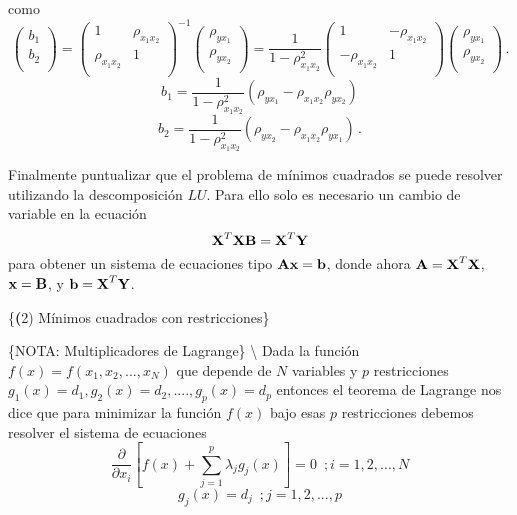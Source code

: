 \documentclass[
]{agujournal2019}
\begin{document}
como \[\left(\begin{array}{c}
  b_1 \\
  b_2 \\
        \end{array}\right)=\left(\begin{array}{cc}
  1 & \rho_{x_{1} x_{2}} \\
  \rho_{x_{1} x_{2}} & 1 \\
        \end{array}\right)^{-1}
     \left(\begin{array}{c}
  \rho_{y x_{1}} \\
  \rho_{y x_{2}} \\
        \end{array}\right)=\frac{1}{1-\rho^2_{x_{1} x_{2}}}
    \left(\begin{array}{cc}
  1 & -\rho_{x_{1} x_{2}} \\
  -\rho_{x_{1} x_{2}} & 1 \\
        \end{array}\right)\left(\begin{array}{c}
  \rho_{y x_{1}} \\
  \rho_{y x_{2}} \\
        \end{array}\right)\,.\]
\[b_1=\frac{1}{1-\rho^2_{x_{1} x_{2}}}({\rho_{y x_{1}} - \rho_{x_{1} x_{2}} \rho_{y x_{2}}})\]
\[b_2=\frac{1}{1-\rho^2_{x_{1} x_{2}}}({\rho_{y x_{2}} - \rho_{x_{1} x_{2}} \rho_{y x_{1}}})\,.\]

\noindent Finalmente puntualizar que el problema de mínimos cuadrados se
puede resolver utilizando la descomposición \(LU\). Para ello solo es
necesario un cambio de variable en la ecuación
\[{\textbf X}^T{\textbf X}{\textbf B}={\textbf X}^T{\textbf Y}\] para
obtener un sistema de ecuaciones tipo
\({\textbf A}{\textbf x}={\textbf b}\), donde ahora
\({\textbf A}={\textbf X}^T{\textbf X}\), \({\textbf x}={\textbf B}\), y
\({\textbf b}={\textbf X}^T{\textbf Y}\).

\vspace{0.5cm}

\{\noindent \textbf (2) Mínimos cuadrados con restricciones\}

\vspace{0.5cm}

\{\textbf \noindent NOTA: Multiplicadores de Lagrange\} \textbackslash{}
\noindent Dada la función \(f(x)=f(x_1,x_2,...,x_N)\) que depende de
\(N\) variables y \(p\) restricciones
\(g_1(x)=d_1, g_2(x)=d_2,....,g_p(x)=d_p\) entonces el teorema de
Lagrange nos dice que para minimizar la función \(f(x)\) bajo esas \(p\)
restricciones debemos resolver el sistema de ecuaciones
\[\frac{\partial}{\partial{x_i}}\left[ f(x) +\sum\limits_{j=1}^p \lambda_j g_j(x)\right]=0\,\,\,; i=1,2,...,N\]
\[g_j(x)=d_j\,\,\,; j=1,2,...,p\]
\end{document}
